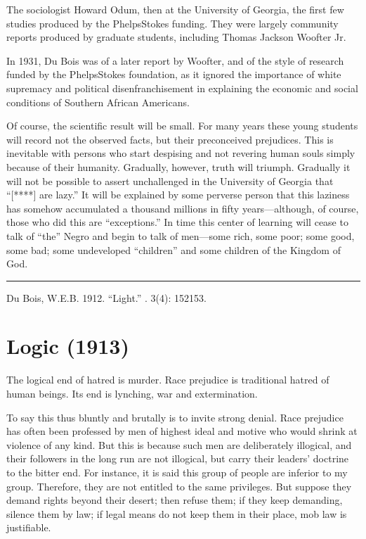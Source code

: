 \documentclass[letterpaper,10pt,english]{jupyterBook}
\begin{document}
\begin{sphinxShadowBox}
\sphinxstylesidebartitle{}

\sphinxAtStartPar
The sociologist Howard Odum, then at the University of Georgia,  the first few studies produced by the Phelps\sphinxhyphen{}Stokes funding. They were largely community reports produced by graduate students, including Thomas Jackson Woofter Jr.

\sphinxAtStartPar
In 1931, Du Bois was  of a later report by Woofter, and of the style of research funded by the Phelps\sphinxhyphen{}Stokes foundation, as it  ignored the importance of white supremacy and political disenfranchisement in explaining the economic and social conditions of Southern African Americans.
\end{sphinxShadowBox}

\sphinxAtStartPar
Of course, the scientific result will be small. For many years these young students will record not the observed facts, but their preconceived prejudices. This is inevitable with persons who start despising and not revering human souls simply because of their humanity. Gradually, however, truth will triumph.	Gradually it will not be possible to assert unchallenged in the University of Geor­gia that “{[}****{]} are lazy.” It will be explained by some perverse per­son that this laziness has somehow accumulated a thousand millions in fifty years—although, of course, those who did this are “exceptions.” In time this center of learning will cease to talk of “the” Negro and begin to talk of men—some rich, some poor; some good, some bad; some undeveloped “children” and some children of the Kingdom of God.


\bigskip\hrule\bigskip


\sphinxAtStartPar
{} Du Bois, W.E.B. 1912. “Light.” . 3(4): 152\sphinxhyphen{}153.


\section{Logic (1913)}
\label{\detokenize{Volumes/06/02/logic:logic-1913}}\label{\detokenize{Volumes/06/02/logic::doc}}
\sphinxAtStartPar
The logical end of hatred is murder. Race prejudice is traditional hatred of human beings. Its end is lynching, war and extermination.

\sphinxAtStartPar
To say this thus bluntly and brutally is to invite strong denial. Race prejudice has often been professed by men of highest ideal and motive who would shrink at violence of any kind. But this is because such men are deliberately illogical, and their followers in the long run are not illogical, but carry their leaders’ doctrine to the bitter end. For instance, it is said this group of people are inferior to my group. Therefore, they are not entitled to the same privileges. But suppose they demand rights beyond their desert; then refuse them; if they keep demanding, silence them by law; if legal means do not keep them in their place, mob law is justifiable.
\end{document}
